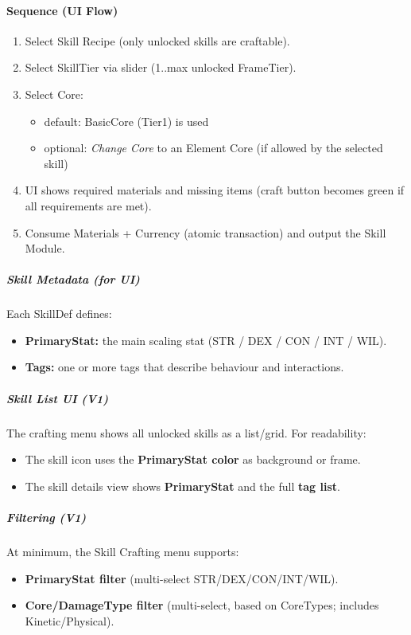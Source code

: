 \paragraph{Sequence (UI Flow)}
\begin{enumerate}
	\item Select Skill Recipe (only unlocked skills are craftable).
	\item Select SkillTier via slider (1..max unlocked FrameTier).
	\item Select Core:
	\begin{itemize}
		\item default: BasicCore (Tier1) is used
		\item optional: \textit{Change Core} to an Element Core (if allowed by the selected skill)
	\end{itemize}
	\item UI shows required materials and missing items (craft button becomes green if all requirements are met).
	\item Consume Materials + Currency (atomic transaction) and output the Skill Module.
\end{enumerate}

\subparagraph{Skill Metadata (for UI)}
Each SkillDef defines:
\begin{itemize}
	\item \textbf{PrimaryStat:} the main scaling stat (STR / DEX / CON / INT / WIL).
	\item \textbf{Tags:} one or more tags that describe behaviour and interactions.
\end{itemize}

\subparagraph{Skill List UI (V1)}
The crafting menu shows all unlocked skills as a list/grid. For readability:
\begin{itemize}
	\item The skill icon uses the \textbf{PrimaryStat color} as background or frame.
	\item The skill details view shows \textbf{PrimaryStat} and the full \textbf{tag list}.
\end{itemize}

\subparagraph{Filtering (V1)}
At minimum, the Skill Crafting menu supports:
\begin{itemize}
	\item \textbf{PrimaryStat filter} (multi-select STR/DEX/CON/INT/WIL).
	\item \textbf{Core/DamageType filter} (multi-select, based on CoreTypes; includes Kinetic/Physical).
\end{itemize}

